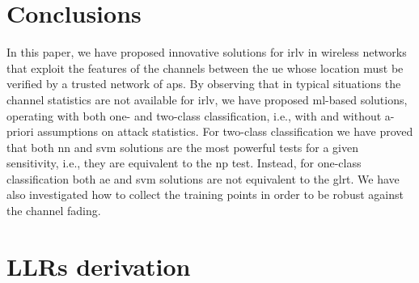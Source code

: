 \documentclass[final,twocolumn]{IEEEtran}
\begin{document}

\section{Conclusions}

In this paper, we have proposed innovative solutions for \ac{irlv} in wireless networks that exploit the features of the channels between the \ac{ue} whose location must be verified by a trusted network of \acp{ap}. By observing that in typical situations the channel statistics are not available for \ac{irlv}, we have proposed \ac{ml}-based solutions, operating with both one- and two-class classification, i.e., with and without a-priori assumptions on attack statistics. For two-class classification we have proved that  both \ac{nn} and \ac{svm} solutions  are the most powerful tests for a given sensitivity, i.e., they are equivalent to the \ac{np} test. Instead, for one-class classification both \ac{ae} and \ac{svm} solutions are not equivalent to the \ac{glrt}. We have also investigated how to collect the training points in order to be robust against the channel fading.

\appendices

\section{LLRs derivation}
\label{sec:llrDer}
\end{document}
